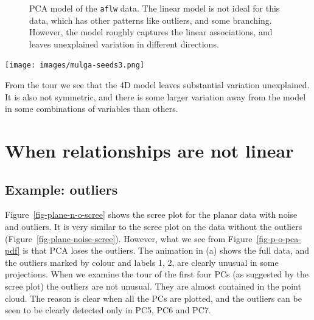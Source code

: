 \documentclass[
  letterpaper,
]{krantz}
\newcommand{\insightbox}[1]{%
\noindent\colorbox{insight!30}{%
\begin{minipage}{0.98\textwidth}%
    \centering%
    \begin{minipage}[c]{0.15\textwidth} %
      \texttt{[image: images/mulga-seeds3.png]} %
    \end{minipage}%
    \hfill %
    \begin{minipage}[c]{0.8\textwidth} %
      \bigskip%
      \textsf{#1}%
      \bigskip%
    \end{minipage}%
    \hspace*{3mm}%
  \end{minipage}%
}%
}
\begin{document}
\begin{figure}


\caption{\label{fig-aflw-model-pdf}PCA model of the \texttt{aflw} data.
The linear model is not ideal for this data, which has other patterns
like outliers, and some branching. However, the model roughly captures
the linear associations, and leaves unexplained variation in different
directions. }

\end{figure}%

\insightbox{From the tour we see that the 4D model leaves substantial variation unexplained. It is also not symmetric, and there is some larger variation away from the model in some combinations of variables than others.}

\section{When relationships are not
linear}\label{when-relationships-are-not-linear}

\subsection{Example: outliers}\label{example-outliers}


Figure~\ref{fig-plane-n-o-scree} shows the scree plot for the planar
data with noise and outliers. It is very similar to the scree plot on
the data without the outliers (Figure~\ref{fig-plane-noise-scree}).
However, what we see from Figure~\ref{fig-p-o-pca-pdf} is that PCA loses
the outliers. The animation in (a) shows the full data, and the outliers
marked by colour and labels 1, 2, are clearly unusual in some
projections. When we examine the tour of the first four PCs (as
suggested by the scree plot) the outliers are not unusual. They are
almost contained in the point cloud. The reason is clear when all the
PCs are plotted, and the outliers can be seen to be clearly detected
only in PC5, PC6 and PC7.
\end{document}
